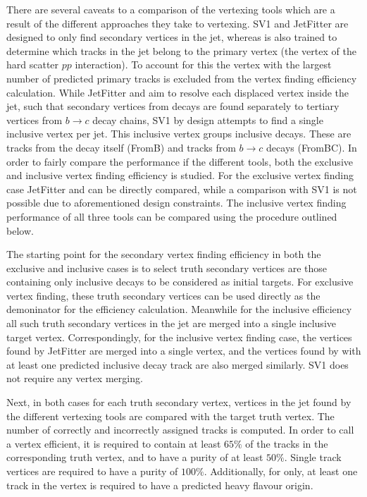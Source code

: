 There are several caveats to a comparison of the vertexing tools which are a result of the different approaches they take to vertexing.
SV1 and JetFitter are designed to only find secondary vertices in the jet, whereas \GNN is also trained to determine which tracks in the jet belong to the primary vertex (the vertex of the hard scatter $pp$ interaction).
To account for this the \GNN vertex with the largest number of predicted primary tracks is excluded from the vertex finding efficiency calculation.
While JetFitter and \GNN aim to resolve each displaced vertex inside the jet, such that secondary vertices from \bhadron decays are found separately to tertiary vertices from $b \rightarrow c$ decay chains, SV1 by design attempts to find a single inclusive vertex per jet.
This inclusive vertex groups inclusive \bhadron decays.
These are tracks from the \bhadron decay itself (FromB) and tracks from $b \rightarrow c$ decays (FromBC).
In order to fairly compare the performance if the different tools, both the exclusive and inclusive vertex finding efficiency is studied.
For the exclusive vertex finding case JetFitter and \GNN can be directly compared, while a comparison with SV1 is not possible due to aforementioned design constraints.
The inclusive vertex finding performance of all three tools can be compared using the procedure outlined below.

The starting point for the secondary vertex finding efficiency in both the exclusive and inclusive cases is to select truth secondary vertices are those containing only inclusive \bhadron decays to be considered as initial targets.
For exclusive vertex finding, these truth secondary vertices can be used directly as the demoninator for the efficiency calculation.
Meanwhile for the inclusive efficiency all such truth secondary vertices in the jet are merged into a single inclusive target vertex.
Correspondingly, for the inclusive vertex finding case, the vertices found by JetFitter are merged into a single vertex, and the vertices found by \GNN with at least one predicted inclusive \bhadron decay track are also merged similarly.
SV1 does not require any vertex merging.

Next, in both cases for each truth secondary vertex, vertices in the jet found by the different vertexing tools are compared with the target truth vertex.
The number of correctly and incorrectly assigned tracks is computed.
In order to call a vertex efficient, it is required to contain at least $65\%$ of the tracks in the corresponding truth vertex, and to have a purity of at least $50\%$.
Single track vertices are required to have a purity of $100\%$.
Additionally, for \GNN only, at least one track in the vertex is required to have a predicted heavy flavour origin.


